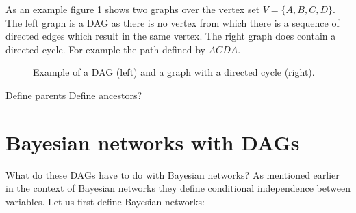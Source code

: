 \noindent
As an example figure \ref{fig:example_DAG} shows two graphs 
over the vertex set $V=\{A, B, C, D\}$. The left graph is a DAG
as there is no vertex from which there is a sequence of directed
edges which result in the same vertex. The right graph does 
contain a directed cycle. For example the path defined by $ACDA$.

\begin{figure}[h!]
\centering

\begin{minipage}[c]{0.3\textwidth}
\end{minipage}
\begin{minipage}[c]{0.3\textwidth}
\end{minipage}
\caption{Example of a DAG (left) and a graph with a directed
cycle (right).}
\label{fig:example_DAG}
\end{figure}

Define parents
Define ancestors?

\section{Bayesian networks with DAGs}
What do these DAGs have to do with Bayesian networks? As mentioned
earlier in the context of Bayesian networks they define conditional
independence between variables. Let us first define Bayesian networks:

\begin{defn}

\end{defn}